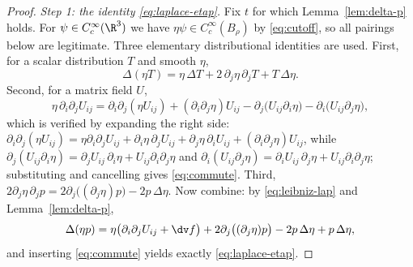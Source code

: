 \documentclass[11pt,reqno]{amsart}
\begin{document}
\begin{proof}
\emph{Step 1: the identity \eqref{eq:laplace-etap}.} Fix $t$ for which
Lemma~\ref{lem:delta-p} holds. For $\psi\in C_{c}^{\infty}(\R^{3})$ we have
$\eta\psi\in C_{c}^{\infty}(B_{\rho})$ by \eqref{eq:cutoff}, so all pairings
below are legitimate. Three elementary distributional identities are used. First,
for a scalar distribution $T$ and smooth $\eta$,
\begin{equation}\label{eq:leibniz-lap}
  \Delta(\eta T)=\eta\,\Delta T+2\,\partial_{j}\eta\,\partial_{j}T+T\,\Delta\eta .
\end{equation}
Second, for a matrix field $U$,
\begin{equation}\label{eq:commute}
  \eta\,\partial_{i}\partial_{j}U_{ij}
  =\partial_{i}\partial_{j}(\eta U_{ij})
   +(\partial_{i}\partial_{j}\eta)U_{ij}
   -\partial_{j}\bigl(U_{ij}\partial_{i}\eta\bigr)
   -\partial_{i}\bigl(U_{ij}\partial_{j}\eta\bigr),
\end{equation}
which is verified by expanding the right side:
$\partial_{i}\partial_{j}(\eta U_{ij})
 =\eta\partial_{i}\partial_{j}U_{ij}+\partial_{i}\eta\,\partial_{j}U_{ij}
  +\partial_{j}\eta\,\partial_{i}U_{ij}+(\partial_{i}\partial_{j}\eta)U_{ij}$,
while
$\partial_{j}(U_{ij}\partial_{i}\eta)
 =\partial_{j}U_{ij}\,\partial_{i}\eta+U_{ij}\partial_{i}\partial_{j}\eta$
and
$\partial_{i}(U_{ij}\partial_{j}\eta)
 =\partial_{i}U_{ij}\,\partial_{j}\eta+U_{ij}\partial_{i}\partial_{j}\eta$;
substituting and cancelling gives \eqref{eq:commute}. Third,
$2\partial_{j}\eta\,\partial_{j}p
 =2\partial_{j}\bigl((\partial_{j}\eta)p\bigr)-2p\,\Delta\eta$.
Now combine: by \eqref{eq:leibniz-lap} and
Lemma~\ref{lem:delta-p},
\[
  \Delta(\eta p)
  =\eta\bigl(\partial_{i}\partial_{j}U_{ij}+\dv f\bigr)
   +2\partial_{j}\bigl((\partial_{j}\eta)p\bigr)-2p\,\Delta\eta+p\,\Delta\eta ,
\]
and inserting \eqref{eq:commute} yields exactly \eqref{eq:laplace-etap}.


\end{proof}
\end{document}
